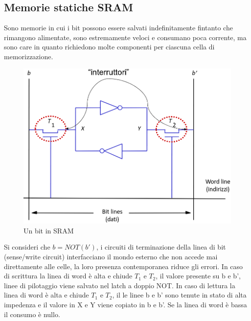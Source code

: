\subsection{Memorie statiche SRAM}
Sono memorie in cui i bit possono essere salvati indefinitamente fintanto che rimangono alimentate, sono estremamente veloci e consumano poca corrente, ma sono care
in quanto richiedono molte componenti per ciascuna cella di memorizzazione.
\begin{figure}
  \includegraphics[scale=0.2]{Pictures/SRAM.png}
  \caption{Un bit in SRAM}
  \label{fig:boat1}
\end{figure}
Si consideri che $b=NOT(b')$, i circuiti di terminazione della linea di bit (sense/write circuit) interfacciano il mondo esterno che non accede mai direttamente alle 
celle, la loro presenza contemporanea riduce gli errori. In caso di scrittura la linea di word \`e alta e chiude $T_1$ e $T_2$, il valore presente su b e b', linee di 
pilotaggio viene salvato nel latch a doppio NOT. In caso di lettura la linea di word \`e alta e chiude $T_1$ e $T_2$, il le linee b e b' sono tenute in stato di alta 
impedenza e il valore in X e Y viene copiato in b e b'. Se la linea di word \`e bassa il consumo \`e nullo. 
